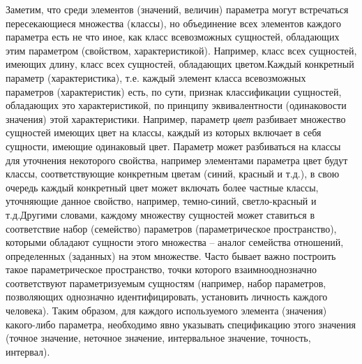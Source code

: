\begin{SCn}
\begin{scnsubstruct}
{            Заметим, что среди элементов (значений, величин) параметра могут встречаться пересекающиеся множества (классы), но объединение всех элементов каждого параметра есть не что иное, как класс всевозможных сущностей, обладающих этим параметром (свойством, характеристикой). Например, класс всех сущностей, имеющих длину, класс всех сущностей, обладающих цветом.Каждый конкретный параметр (характеристика), т.е. каждый элемент класса всевозможных параметров (характеристик) есть, по сути, признак классификации сущностей, обладающих это характеристикой, по принципу эквивалентности (одинаковости значения) этой характеристики. Например, параметр \textit{цвет} разбивает множество сущностей имеющих цвет на классы, каждый из которых включает в себя сущности, имеющие одинаковый цвет. Параметр может разбиваться на классы для уточнения некоторого свойства, например элементами параметра цвет будут классы, соответствующие конкретным цветам (синий, красный и т.д.), в свою очередь каждый конкретный цвет может включать более частные классы, уточняющие данное свойство, например, темно-синий, светло-красный и т.д.Другими словами, каждому множеству сущностей может ставиться в соответствие набор (семейство) параметров (параметрическое пространство), которыми обладают сущности этого множества -- аналог семейства отношений, определенных (заданных) на этом множестве. Часто бывает важно построить такое параметрическое пространство, точки которого взаимнооднозначно соответствуют параметризуемым сущностям (например, набор параметров, позволяющих однозначно идентифицировать, установить личность каждого человека). Таким образом, для каждого используемого элемента (значения) какого-либо параметра, необходимо явно указывать спецификацию этого значения (точное значение, неточное значение, интервальное значение, точность, интервал).}

\end{scnsubstruct}
\end{SCn}
